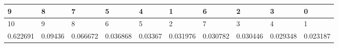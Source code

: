 \begin{tabular}{llllllllll}
\toprule
        9 &        8 &         7 &         5 &        4 &         1 &         6 &         2 &         3 &         0 \\
\midrule
       10 &        9 &         8 &         6 &        5 &         2 &         7 &         3 &         4 &         1 \\
 0.622691 &  0.09436 &  0.066672 &  0.036868 &  0.03367 &  0.031976 &  0.030782 &  0.030446 &  0.029348 &  0.023187 \\
\bottomrule
\end{tabular}
